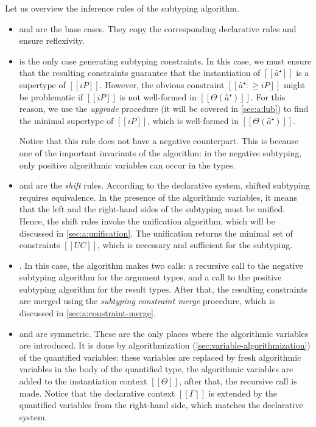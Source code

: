 Let us overview the inference rules of the subtyping algorithm.
\begin{itemize}
  \item {} and  
    are the base cases. They copy the corresponding declarative rules and
    ensure reflexivity.
  \item {} is the only case generating 
    subtyping constraints. In this case, we must ensure
    that the resulting constraints guarantee that the instantiation of 
    $[[â⁺]]$ is a supertype of $[[iP]]$.
    However, the obvious constraint $[[â⁺ :≥ iP]]$ might be problematic
    if  $[[iP]]$ is not well-formed in $[[Θ(â⁺)]]$. For this reason,
    we use the \emph{upgrade} procedure (it will be covered in \cref{sec:a:lub})
    to find the minimal supertype of $[[iP]]$, which is well-formed in $[[Θ(â⁺)]]$. 

    Notice that this rule does not have a negative counterpart. This is
    because one of the important invariants of the algorithm: 
    in the negative subtyping, only positive algorithmic variables
    can occur in the types. 
    
  \item {} and  are the
    \emph{shift} rules. According to the declarative system,
    shifted subtyping requires equivalence. In the presence of the algorithmic 
    variables, it means that the left and the right-hand sides of the subtyping
    must be unified. Hence, the shift rules invoke the unification algorithm, 
    which will be discussed in \cref{sec:a:unification}. The unification 
    returns the minimal set of constraints $[[UC]]$, which is necessary
    and sufficient for the subtyping. 

  \item {}.
    In this case, the algorithm makes two calls:
    a recursive call to the negative subtyping algorithm for the argument types,
    and a call to the positive subtyping algorithm for the result types.
    After that, the resulting constraints are merged using the
    \emph{subtyping constraint merge} procedure, 
    which is discussed in \cref{sec:a:constraint-merge}.
  \item {} and 
    are symmetric. These are the only places where 
    the algorithmic variables are introduced.
    It is done by algorithmization (\cref{sec:variable-algorithmization}) 
    of the quantified variables: these variables are replaced by 
    fresh algorithmic variables in the body of the quantified type,
    the algorithmic variables are added to the instantiation context $[[Θ]]$,
    after that, the recursive call is made. Notice that the declarative context
    $[[Γ]]$ is extended by the quantified variables from the right-hand side,
    which matches the declarative system.
\end{itemize}


